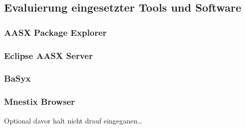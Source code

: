 \subsection{Evaluierung eingesetzter Tools und Software}
\subsubsection{AASX Package Explorer}
\subsubsection{Eclipse AASX Server}
\subsubsection{BaSyx}
\subsubsection{Mnestix Browser}
Optional davor halt nicht drauf eingeganen\dots